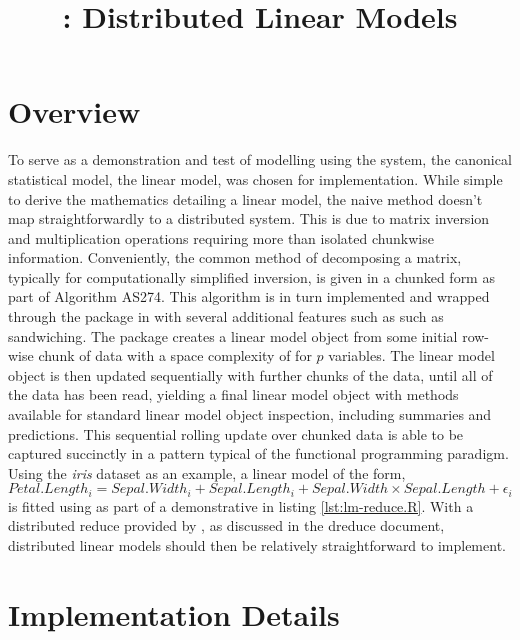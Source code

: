 \documentclass[a4paper, 10pt]{article}
\begin{document}
\title{: Distributed Linear Models}
  
\maketitle

\section{Overview}

To serve as a demonstration and test of modelling using the \lsr{} system, the canonical statistical model, the linear model, was chosen for implementation.
While simple to derive the mathematics detailing a linear model, the naive method doesn't map straightforwardly to a distributed system.
This is due to matrix inversion and multiplication operations requiring more than isolated chunkwise information.
Conveniently, the common method of decomposing a matrix, typically for computationally simplified inversion, is given in a chunked form as part of Algorithm AS274\cite{miller1992as274}.
This algorithm is in turn implemented and wrapped through the  package in \R{} with several additional features such as such as sandwiching\cite{lumley2013biglm}.
The  package creates a linear model object from some initial row-wise chunk of data with a space complexity of  for $p$ variables.
The linear model object is then updated sequentially with further chunks of the data, until all of the data has been read, yielding a final linear model object with methods available for standard linear model object inspection, including summaries and predictions.
This sequential rolling update over chunked data is able to be captured succinctly in a  pattern typical of the functional programming paradigm.
Using the \textit{iris} dataset as an example, a linear model of the form, 
$$ Petal.Length_i = Sepal.Width_i + Sepal.Length_i + Sepal.Width \times Sepal.Length + \epsilon_i$$
is fitted using  as part of a demonstrative  in listing \ref{lst:lm-reduce.R}.
With a distributed reduce provided by \lsr{}, as discussed in the dreduce document, distributed linear models should then be relatively straightforward to implement.

\section{Implementation Details}
\end{document}
